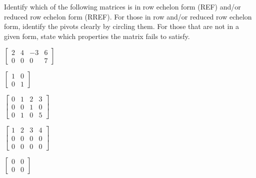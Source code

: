 \begin{activity} \label{act:1_c_1} Identify which of the following matrices is in row echelon form (REF) and/or reduced row echelon form (RREF). For those in row and/or reduced row echelon form, identify the pivots clearly by circling them. For those that are not in a given form, state which properties the matrix fails to satisfy. 

\ba
\begin{minipage}{1.75in}
 \item $\left[ \begin{array}{ccrc} 2 & 4 & -3 & 6 \\ 0 & 0 & 0 & 7 \end{array} \right]$ 
\end{minipage}
\begin{minipage}{1.5in}
\item $\left[ \begin{array}{cc} 1 & 0  \\ 0 & 1 \end{array} \right]$ 
\end{minipage}
\begin{minipage}{1.5in}
\item $\left[ \begin{array}{cccc} 0 & 1 & 2 & 3 \\ 0 & 0 & 1 & 0 \\ 0 & 1 & 0 & 5 \end{array} \right]$ 
\end{minipage} 

\begin{minipage}{1.75in}
\item $\left[ \begin{array}{cccc} 1 & 2 & 3 & 4 \\ 0 & 0 & 0 & 0 \\ 0 & 0 & 0 & 0 \end{array} \right]$ 
\end{minipage}
\begin{minipage}{1.5in}
\item $\left[ \begin{array}{cc} 0 & 0 \\ 0 & 0 \end{array} \right]$ 
\end{minipage}
\ea 

\end{activity}


\label{sec:num_sols_ls}

